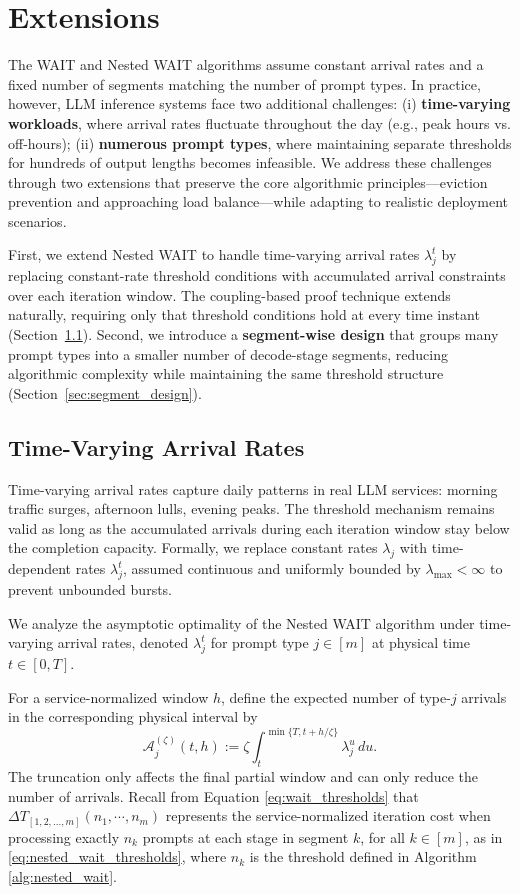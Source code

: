 \section{Extensions}\label{sec:extension}

The WAIT and Nested WAIT algorithms assume constant arrival rates and a fixed number of segments matching the number of prompt types. In practice, however, LLM inference systems face two additional challenges: (i) \textbf{time-varying workloads}, where arrival rates fluctuate throughout the day (e.g., peak hours vs. off-hours); (ii) \textbf{numerous prompt types}, where maintaining separate thresholds for hundreds of output lengths becomes infeasible. We address these challenges through two extensions that preserve the core algorithmic principles—eviction prevention and approaching load balance—while adapting to realistic deployment scenarios.

First, we extend Nested WAIT to handle time-varying arrival rates $\lambda_j^t$ by replacing constant-rate threshold conditions with accumulated arrival constraints over each iteration window. The coupling-based proof technique extends naturally, requiring only that threshold conditions hold at every time instant (Section~\ref{sec:time_varying}). Second, we introduce a \textbf{segment-wise design} that groups many prompt types into a smaller number of decode-stage segments, reducing algorithmic complexity while maintaining the same threshold structure (Section~\ref{sec:segment_design}).

\subsection{Time-Varying Arrival Rates}\label{sec:time_varying}

Time-varying arrival rates capture daily patterns in real LLM services: morning traffic surges, afternoon lulls, evening peaks. The threshold mechanism remains valid as long as the accumulated arrivals during each iteration window stay below the completion capacity. Formally, we replace constant rates $\lambda_j$ with time-dependent rates $\lambda_j^t$, assumed continuous and uniformly bounded by $\lambda_{\max} < \infty$ to prevent unbounded bursts.

We analyze the asymptotic optimality of the Nested WAIT algorithm under time-varying arrival rates, denoted $\lambda_j^t$ for prompt type $j \in [m]$ at physical time $t \in [0, T]$.

For a service-normalized window \(h\), define the expected number of type-\(j\) arrivals in the corresponding physical interval by
\[
    \mathcal A_j^{(\zeta)}(t,h)
    :=
    \zeta\int_t^{\min\{T,t+h/\zeta\}}\lambda_j^u\,du .
\]
The truncation only affects the final partial window and can only reduce the number of arrivals.
Recall from Equation \eqref{eq:wait_thresholds} that $\Delta T_{[1,2,\dots,m]}(n_1,\cdots,n_m)$ represents the service-normalized iteration cost when processing exactly $n_k$ prompts at each stage in segment $k$, for all $k \in [m]$, as in \eqref{eq:nested_wait_thresholds}, where $n_k$ is the threshold defined in Algorithm \ref{alg:nested_wait}.


